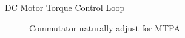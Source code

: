 \begin{frame}{DC Motor Torque Control Loop}
	\begin{figure}
		\centering
		\caption{Commutator naturally adjust for MTPA}
	\end{figure}
\end{frame}



